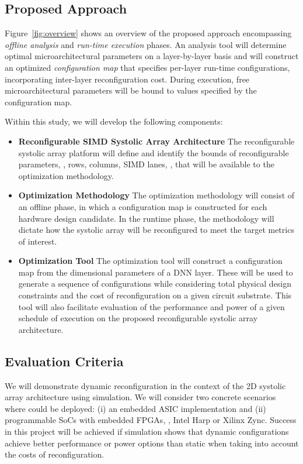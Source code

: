 \subsection{Proposed Approach}

Figure~\ref{fig:overview} shows an overview of the proposed approach encompassing \emph{offline analysis} and \emph{run-time execution} phases. 
An analysis tool will determine optimal microarchitectural parameters on a layer-by-layer basis and will construct an optimized \emph{configuration map} that specifies per-layer run-time configurations, incorporating inter-layer reconfiguration cost.
During execution, free microarchitectural parameters will be bound to values specified by the configuration map.

Within this study, we will develop the following components:
\begin{itemize}
\item \textbf{Reconfigurable SIMD Systolic Array Architecture}
The reconfigurable systolic array platform will define and identify the bounds of reconfigurable parameters, \eg, rows, columns, SIMD lanes, \etc,  that will be available to the optimization methodology.
\item \textbf{Optimization Methodology}
The optimization methodology will consist of an offline phase, in which a configuration map is constructed for each hardware design candidate.
In the runtime phase, the methodology will dictate how the systolic array will be reconfigured to meet the target metrics of interest.
\item \textbf{Optimization Tool} 
The optimization tool will construct a configuration map from the dimensional parameters of a DNN layer.
These will be used to generate a sequence of configurations while considering total physical design constraints and the cost of reconfiguration on a given circuit substrate.
This tool will also facilitate evaluation of the performance and power of a given schedule of execution on the proposed reconfigurable systolic array architecture.
\end{itemize}

\subsection{Evaluation Criteria}

We will demonstrate dynamic reconfiguration in the context of the 2D systolic array architecture using simulation.
We will consider two concrete scenarios where \dyhardDnns could be deployed: (i) an embedded ASIC implementation and (ii) programmable SoCs with embedded FPGAs, \eg, Intel Harp or Xilinx Zync. 
Success in this project will be achieved if simulation shows that dynamic configurations achieve better performance or power options than static when taking into account the costs of reconfiguration.

